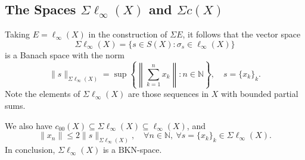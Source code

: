 \documentclass[14pt, a4paper]{article}  %
\providecommand{\pare}[1]{\left( #1\right) }
\providecommand{\norm}[1]{\left\lVert#1\right\rVert}
\newcommand{\BKn}{\text{BKN}}
\newtheorem{lemma}{Lemma}[section]
\begin{document}
%		

	 
		
		
	\subsection{The Spaces $\Sigma \ell_{\infty}(X)$ and $\Sigma c(X)$} 
	
	Taking $E = \ell_{\infty}(X)$ in the  construction of $\Sigma E$, it follows that the vector space
	\begin{equation}\label{d264_a} 
		\Sigma \ell_{\infty}(X) = \{s \in S(X): \sigma_s \in \ell_{\infty}(X)\}
	\end{equation} 
	is a Banach space with the norm 
	\begin{equation}
	\|s\|_{\Sigma \ell_{\infty}(X)} = \sup \left\{ \left\| \sum_{k=1}^n x_k \right\| : n \in \mathbb{N} \right\}, \quad s = \{x_{k}\}_{k}. 
	\end{equation}
    Note the elements of $\Sigma \ell_{\infty}(X)$ are those sequences in $X$ with bounded partial sums.	
    
    We also have   $c_{00}(X) \subseteq \Sigma \ell_{\infty}(X) \subseteq \ell_{\infty}(X)$, and
	\begin{equation}
		\|x_n\| \leq 2 \|s\|_{\Sigma \ell_{\infty}(X)}, \quad \forall n \in \mathbb{N}, \ \forall s = \{x_k\}_k \in \Sigma \ell_{\infty}(X).
	\end{equation}
	 In conclusion,  $\Sigma \ell_{\infty}(X)$ is a $\BKn$-space. 
	
\end{document}
